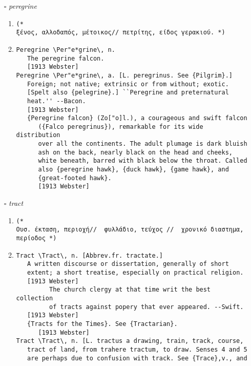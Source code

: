 \documentclass{article}
\begin{document}
\begin{itemize}
\begin{enumerate}
\item{
\begin{lstlisting}
Allusory \Al*lu"so*ry\, a.
   Allusive. [R.] --Warburton.
   [1913 Webster]
\end{lstlisting}}
\end{enumerate}
\item[$\square$] \emph{ peregrine }
\begin{enumerate}
\item{
\begin{lstlisting}
(* 
ξένος, αλλοδαπός, μέτοικος// πετρίτης, είδος γερακιού. *)
\end{lstlisting}}
\item{
\begin{lstlisting}
Peregrine \Per"e*grine\, n.
   The peregrine falcon.
   [1913 Webster]
Peregrine \Per"e*grine\, a. [L. peregrinus. See {Pilgrim}.]
   Foreign; not native; extrinsic or from without; exotic.
   [Spelt also {pelegrine}.] ``Peregrine and preternatural
   heat.'' --Bacon.
   [1913 Webster]
   {Peregrine falcon} (Zo["o]l.), a courageous and swift falcon
      ({Falco peregrinus}), remarkable for its wide distribution
      over all the continents. The adult plumage is dark bluish
      ash on the back, nearly black on the head and cheeks,
      white beneath, barred with black below the throat. Called
      also {peregrine hawk}, {duck hawk}, {game hawk}, and
      {great-footed hawk}.
      [1913 Webster]
\end{lstlisting}}
\end{enumerate}
\item[$\square$] \emph{ tract }
\begin{enumerate}
\item{
\begin{lstlisting}
(* 
Ουσ. έκταση, περιοχή//  φυλλάδιο, τεύχος //  χρονικό διαστημα, περίοδος *)
\end{lstlisting}}
\item{
\begin{lstlisting}
Tract \Tract\, n. [Abbrev.fr. tractate.]
   A written discourse or dissertation, generally of short
   extent; a short treatise, especially on practical religion.
   [1913 Webster]
         The church clergy at that time writ the best collection
         of tracts against popery that ever appeared. --Swift.
   [1913 Webster]
   {Tracts for the Times}. See {Tractarian}.
      [1913 Webster]
Tract \Tract\, n. [L. tractus a drawing, train, track, course,
   tract of land, from trahere tractum, to draw. Senses 4 and 5
   are perhaps due to confusion with track. See {Trace},v., and

\end{lstlisting}}
\end{enumerate}
\end{itemize}
\end{document}
